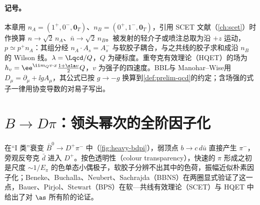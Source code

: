 \paragraph{记号。}
本章用 $n_A=(1^+,0^-,\mathbf 0_T)$、$n_B=(0^+,1^-,\mathbf 0_T)$，引用 SCET 文献（\cref{ch:scet}）时作换算 $n\to\sqrt2\,n_A$、$\bar n\to\sqrt2\,n_B$。被发射的轻介子或喷注总取为沿 $+z$ 运动，$p\simeq p^+n_A$：其组分经 $n_A\cdot A_s=A_s^-$ 与软胶子耦合，与之共线的胶子求和成沿 $n_B$ 的 Wilson 线。$\lambda=\Lqcd/Q$，$Q$ 为硬标度。重夸克有效理论（HQET）的场为 $h_v=\ee^{\ii m_Qv\cdot x}\frac{1+\sla v}{2}Q$，$v$ 为强子的四速度。BBL\cite{BodwinBraatenLepage1995}与 Manohar--Wise\cite{ManoharWise1994}用 $D_\mu=\partial_\mu+\ii gA_\mu$，其公式已按 $g\to-g$ 换算到\cref{def:prelim-qcd}的约定；含场强的式子一律用协变导数的对易子写出。

\section{$B\to D\pi$：领头幂次的全阶因子化}\label{sec:heavy-bdpi}

在“I 类”衰变 $\bar B^0\to D^+\pi^-$ 中（\cref{fig:heavy-bdpi}），弱顶点 $b\to c\,d\bar u$ 直接产生 $\pi^-$，旁观反夸克 $\bar d$ 进入 $D^+$。按色透明性（colour transparency）\cite{Bjorken:1988kk}，快速的 $\pi$ 形成之初是尺度 $\sim1/E_\pi$ 的色单态小偶极子，软胶子分辨不出其中的色荷，振幅近似朴素因子化\cite{Dugan:1990de,Politzer:1991au}；Beneke、Buchalla、Neubert、Sachrajda（BBNS）在两圈显式验证了这一点\cite{BenekeEtAl2000}，Bauer、Pirjol、Stewart（BPS）在软—共线有效理论（SCET）与 HQET 中给出了对 $\as$ 所有阶的论证\cite{BauerPirjolStewart2001}。

